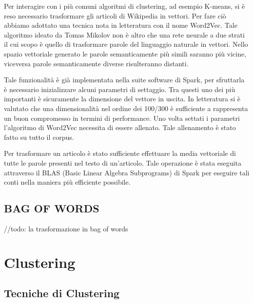 \documentclass[
12pt, %
a4paper, %
oneside, %
headinclude,footinclude, %
BCOR5mm, %
]{scrartcl}
\begin{document}

        Per interagire con i più comuni algoritmi di clustering, ad esempio K-means, si è reso necessario trasformare
        gli articoli di Wikipedia in vettori.
        Per fare ciò abbiamo adottato una tecnica nota in letteratura con il nome Word2Vec. Tale algoritmo ideato da
        Tomas Mikolov non è altro che una rete neurale a due strati il cui scopo è quello di trasformare parole del
        linguaggio naturale in vettori. Nello spazio vettoriale generato le parole semanticamente più simili
        saranno più vicine, viceversa parole semanticamente diverse risulteranno distanti.

        Tale funzionalità è già implementata nella suite software di Spark,
        per sfruttarla è necessario inizializzare alcuni parametri di settaggio. Tra questi uno dei più importanti
        è sicuramente la dimensione del vettore in uscita. In letteratura si è valutato che una dimensionalità
        nel ordine dei 100/300 \cite{w2vdim}
        è sufficiente a rappresenta un buon compromesso in termini di performance.
        Uno volta settati i parametri l'algoritmo di Word2Vec necessita di essere allenato. Tale allenamento è stato
        fatto su tutto il corpus.

        Per trasformare un articolo è stato sufficiente effettuare la media vettoriale di tutte le parole presenti
        nel testo di un'articolo. Tale operazione è stata eseguita attraverso il BLAS (Basic Linear Algebra Subprograms)
        di Spark per eseguire tali conti nella maniera più efficiente possibile.




	\subsection{BAG OF WORDS}

		//todo: la trasformazione in bag of words



\section{Clustering}

	\subsection{Tecniche di Clustering}
\end{document}
